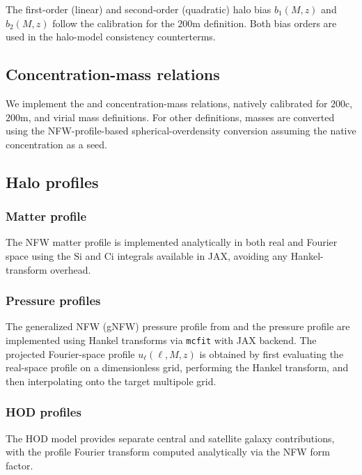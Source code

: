 \documentclass[12pt, preprint]{aastex631}
\begin{document}
The first-order (linear) and second-order (quadratic) halo bias $b_1(M,z)$ and $b_2(M,z)$ follow the \citet{Tinker2010} calibration for the $200\mathrm{m}$ definition. Both bias orders are used in the halo-model consistency counterterms.

\subsection{Concentration-mass relations}

We implement the \citet{Duffy2008} and \citet{Bhattacharya2013} concentration-mass relations, natively calibrated for $200\mathrm{c}$, $200\mathrm{m}$, and virial mass definitions. For other definitions, masses are converted using the NFW-profile-based spherical-overdensity conversion assuming the native concentration as a seed.

\subsection{Halo profiles}

\subsubsection{Matter profile}

The NFW matter profile \citep{Navarro1997} is implemented analytically in both real and Fourier space using the $\mathrm{Si}$ and $\mathrm{Ci}$ integrals available in JAX, avoiding any Hankel-transform overhead.

\subsubsection{Pressure profiles}

The generalized NFW (gNFW) pressure profile from \citet{Nagai2007} and the \citet{Battaglia2012} pressure profile are implemented using Hankel transforms via \texttt{mcfit} with JAX backend. The projected Fourier-space profile $u_\ell(\ell, M, z)$ is obtained by first evaluating the real-space profile on a dimensionless grid, performing the Hankel transform, and then interpolating onto the target multipole grid.

\subsubsection{HOD profiles}

The \citet{Zheng2007} HOD model provides separate central and satellite galaxy contributions, with the profile Fourier transform computed analytically via the NFW form factor.
\end{document}
